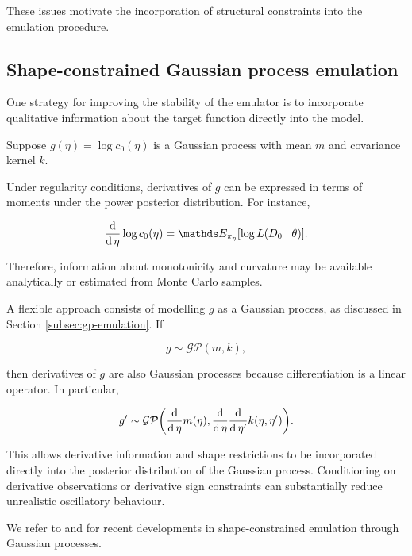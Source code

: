 These issues motivate the incorporation of structural constraints into the emulation procedure.

\subsection{Shape-constrained Gaussian process emulation}
\label{subsec:gp-shape-constrained}

One strategy for improving the stability of the emulator is to incorporate qualitative information about the target function directly into the model.

Suppose $g(\eta) = \log c_0(\eta)$ is a Gaussian process with mean $m$ and covariance kernel $k$.


Under regularity conditions, derivatives of $g$ can be expressed in terms of moments under the power posterior distribution.
For instance,

\begin{equation}
    \dv{\,\eta}
    \log c_0(\eta)
    =
    \bE_{\pi_\eta}
    \qty[
        \log L(D_0 \mid \theta)
    ].
\end{equation}

Therefore, information about monotonicity and curvature may be available analytically or estimated from Monte Carlo samples.

A flexible approach consists of modelling $g$ as a Gaussian process, as discussed in Section \ref{subsec:gp-emulation}.
If

\begin{equation}
    g
    \sim
    \mathcal{GP}(m, k),
\end{equation}

then derivatives of $g$ are also Gaussian processes because differentiation is a linear operator.
In particular,

\begin{equation}
    g'
    \sim
    \mathcal{GP}
    \qty(
        \dv{}{\,\eta} m(\eta),
        \dv{}{\,\eta}\dv{}{\,\eta'} k(\eta, \eta')
    ).
\end{equation}

This allows derivative information and shape restrictions to be incorporated directly into the posterior distribution of the Gaussian process.
Conditioning on derivative observations or derivative sign constraints can substantially reduce unrealistic oscillatory behaviour.

We refer to  and  for recent developments in shape-constrained emulation through Gaussian processes.

